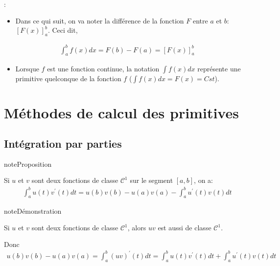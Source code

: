 \documentclass[letterpaper,10pt,french]{sphinxmanual}
\begin{document}
\sphinxAtStartPar
{}:
\begin{itemize}
\item {} 
\sphinxAtStartPar
Dans ce qui suit, on va noter la différence de la fonction \(F\) entre \(a\) et \(b\): \([F(x)]_a^b\). Ceci dit,

\end{itemize}
\begin{equation*}
\begin{split}
\int_a^b f(x)dx = F(b) - F(a) =[F(x)]_a^b
\end{split}
\end{equation*}\begin{itemize}
\item {} 
\sphinxAtStartPar
Lorsque \(f\) est une fonction continue, la notation \(\int f(x)dx\) représente une primitive quelconque de la fonction \(f\) (\(\int f(x)dx = F(x) = Cst\)).

\end{itemize}


\section{Méthodes de calcul des primitives}
\label{\detokenize{methodcalp:methodes-de-calcul-des-primitives}}\label{\detokenize{methodcalp::doc}}

\subsection{Intégration par parties}
\label{\detokenize{methodcalp:integration-par-parties}}
\begin{sphinxadmonition}{note}{Proposition}

\sphinxAtStartPar
Si \(u\) et \(v\) sont deux fonctions de classe \(\mathcal C^1\) sur le segment \([a, b]\), on a:
\begin{equation*}
\begin{split}
\int_a^b u(t)v^{'}(t)dt = u(b)v(b)- u(a)v(a) - \int_a^b u^{'}(t)v(t)dt
\end{split}
\end{equation*}\end{sphinxadmonition}

\begin{sphinxadmonition}{note}{Démonstration}

\sphinxAtStartPar
Si \(u\) et \(v\) sont deux fonctions de classe \(\mathcal C^1\), alors \(uv\) est aussi de classe \(\mathcal C^1\).

\sphinxAtStartPar
Donc
\begin{equation*}
\begin{split}
u(b)v(b)- u(a)v(a) = \int_a^b (uv)^{'}(t)dt = \int_a^b u(t)v^{'}(t)dt + \int_a^b u^{'}(t)v(t)dt
\end{split}
\end{equation*}\end{sphinxadmonition}
\end{document}
